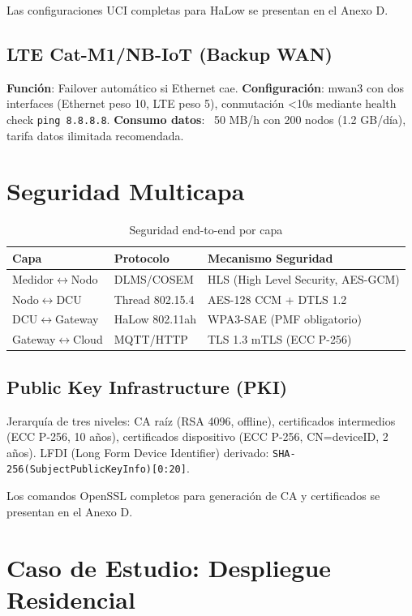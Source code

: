 Las configuraciones UCI completas para HaLow se presentan en el Anexo D.

\subsection{LTE Cat-M1/NB-IoT (Backup WAN)}

\textbf{Función}: Failover automático si Ethernet cae. \textbf{Configuración}: mwan3 con dos interfaces (Ethernet peso 10, LTE peso 5), conmutación <10s mediante health check \texttt{ping 8.8.8.8}. \textbf{Consumo datos}: ~50 MB/h con 200 nodos (1.2 GB/día), tarifa datos ilimitada recomendada.

\section{Seguridad Multicapa}

\begin{table}[h]
\centering
\small
\begin{tabular}{|l|l|l|}
\hline
\textbf{Capa} & \textbf{Protocolo} & \textbf{Mecanismo Seguridad} \\
\hline
Medidor$\leftrightarrow$Nodo & DLMS/COSEM & HLS (High Level Security, AES-GCM) \\
Nodo$\leftrightarrow$DCU & Thread 802.15.4 & AES-128 CCM + DTLS 1.2 \\
DCU$\leftrightarrow$Gateway & HaLow 802.11ah & WPA3-SAE (PMF obligatorio) \\
Gateway$\leftrightarrow$Cloud & MQTT/HTTP & TLS 1.3 mTLS (ECC P-256) \\
\hline
\end{tabular}
\caption{Seguridad end-to-end por capa}
\end{table}

\subsection{Public Key Infrastructure (PKI)}

Jerarquía de tres niveles: CA raíz (RSA 4096, offline), certificados intermedios (ECC P-256, 10 años), certificados dispositivo (ECC P-256, CN=deviceID, 2 años). LFDI (Long Form Device Identifier) derivado: \texttt{SHA-256(SubjectPublicKeyInfo)[0:20]}.

Los comandos OpenSSL completos para generación de CA y certificados se presentan en el Anexo D.

\section{Caso de Estudio: Despliegue Residencial}


